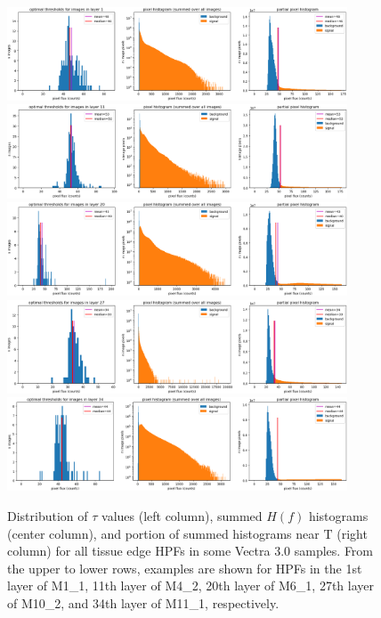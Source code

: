 \documentclass[letterpaper,11pt]{article}
\newcommand{\Tau}{\mathrm{T}}
\begin{document}
\begin{figure}[!ht]
\centering
\includegraphics[width=0.9\textwidth]{images/masking/M1_1_layer_1_background_threshold_plots}
\includegraphics[width=0.9\textwidth]{images/masking/M4_2_layer_11_background_threshold_plots}
\includegraphics[width=0.9\textwidth]{images/masking/M6_1_layer_20_background_threshold_plots}
\includegraphics[width=0.9\textwidth]{images/masking/M10_2_layer_27_background_threshold_plots}
\includegraphics[width=0.9\textwidth]{images/masking/M11_1_layer_34_background_threshold_plots}
\caption{\footnotesize Distribution of $\tau$ values (left column), summed $H(f)$ histograms (center column), and portion of summed histograms near $\Tau$ (right column) for all tissue edge HPFs in some Vectra 3.0 samples. From the upper to lower rows, examples are shown for HPFs in the 1st layer of M1\_1, 11th layer of M4\_2, 20th layer of M6\_1, 27th layer of M10\_2, and 34th layer of M11\_1, respectively.}
\label{fig:threshold_distributions_vectra}
\end{figure}
\end{document}
